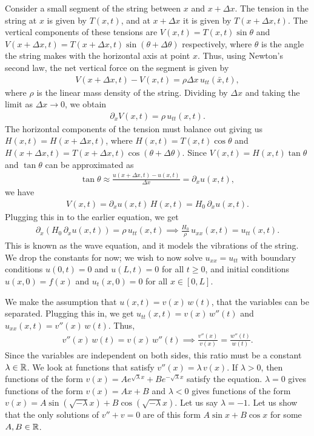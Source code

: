 Consider a small segment of the string between $x$ and $x + \Delta x$. The tension in the string at $x$ is given by $T(x,t)$, and at $x + \Delta x$ it is given by $T(x + \Delta x, t)$. The vertical components of these tensions are $V(x,t) = T(x,t) \sin \theta$ and $V(x + \Delta x, t) = T(x + \Delta x, t) \sin (\theta + \Delta \theta)$ respectively, where $\theta$ is the angle the string makes with the horizontal axis at point $x$. Thus, using Newton's second law, the net vertical force on the segment is given by
\begin{align}
    V(x + \Delta x, t) - V(x,t) = \rho \Delta x \, u_{tt}(\bar{x},t),
\end{align}
where $\rho$ is the linear mass density of the string. Dividing by $\Delta x$ and taking the limit as $\Delta x \to 0$, we obtain
\begin{align}
    \partial_{x} V(x,t) = \rho \, u_{tt}(x,t).
\end{align}
The horizontal components of the tension must balance out giving us $H(x,t) = H(x + \Delta x, t)$, where $H(x,t) = T(x,t) \cos \theta$ and $H(x + \Delta x, t) = T(x + \Delta x, t) \cos (\theta + \Delta \theta)$. Since $V(x,t) = H(x,t) \tan \theta$ and $\tan \theta$ can be approximated as
\begin{align}
    \tan \theta \approx \frac{u(x + \Delta x, t) - u(x,t)}{\Delta x} = \partial_{x} u(x,t),
\end{align}
we have
\begin{align}
    V(x,t) = \partial_{x} u(x,t) \, H(x,t) = H_{0} \, \partial_{x} u(x,t).
\end{align}
Plugging this in to the earlier equation, we get
\begin{align}
    \partial_{x} (H_{0} \, \partial_{x} u(x,t)) = \rho \, u_{tt}(x,t) \implies \frac{H_{0}}{\rho} \, u_{xx}(x,t) = u_{tt}(x,t).
\end{align}
This is known as the wave equation, and it models the vibrations of the string. We drop the constants for now; we wish to now solve $u_{xx} = u_{tt}$ with boundary conditions $u(0,t) = 0$ and $u(L,t) = 0$ for all $t \geq 0$, and initial conditions $u(x,0) = f(x)$ and $u_{t}(x,0) = 0$ for all $x \in [0,L]$.

We make the assumption that $u(x,t) = v(x) \, w(t)$, that the variables can be separated. Plugging this in, we get $u_{tt}(x,t) = v(x) \, w''(t)$ and $u_{xx}(x,t) = v''(x) \, w(t)$. Thus,
\begin{align}
    v''(x) \, w(t) = v(x) \, w''(t) \implies \frac{v''(x)}{v(x)} = \frac{w''(t)}{w(t)}.
\end{align}
Since the variables are independent on both sides, this ratio must be a constant $\lambda \in \mathbb{R}$. We look at functions that satisfy $v''(x) = \lambda \, v(x)$. If $\lambda > 0$, then functions of the form $v(x) = A e^{\sqrt{\lambda} x} + B e^{-\sqrt{\lambda} x}$ satisfy the equation. $\lambda = 0$ gives functions of the form $v(x) = Ax + B$ and $\lambda < 0$ gives functions of the form $v(x) = A \sin (\sqrt{-\lambda} x) + B \cos (\sqrt{-\lambda} x)$. Let us say $\lambda = -1$. Let us show that the only solutions of $v'' + v = 0$ are of this form $A \sin x + B \cos x$ for some $A,B \in \mathbb{R}$.

